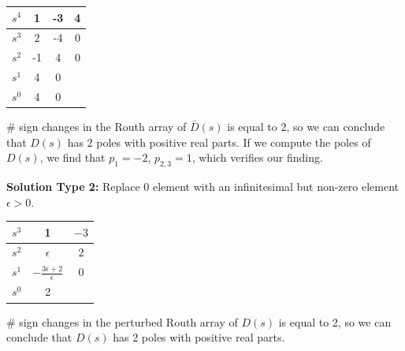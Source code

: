 \documentclass[twoside]{article}
\begin{document}
%
\begin{table}[h]
\begin{center}
\begin{tabular}{|c || c || c c |}
\hline
$s^4$ & 1 & -3 & 4 
\\ \hline
$s^3$ & 2 & -4 & 0
\\ \hline
$s^2$ & -1 & 4 & 0
\\ \hline
$s^1$ & 4 & 0 &
\\ \hline
$s^0$ & 4 & 0 & 
\\ \hline
\end{tabular}
\end{center}
\end{table}
%
$\#$ sign changes in the Routh array of $\bar{D}(s)$ is equal to 2, so
we can conclude that $D(s)$ has 2 poles with positive real parts. If
we compute the poles of $D(s)$, we find that $p_1 = -2$, $p_{2,3} = 1$,
which verifies our finding. 

\vspace{12pt}

\textbf{Solution Type 2:} Replace 0 element with an infinitesimal but
non-zero element $\epsilon >0$.
%
\begin{table}[h]
\begin{center}
\begin{tabular}{|c || c || c  |}
\hline
$s^3$ & 1 & $-3$ 
\\ \hline
$s^2$ & $\epsilon$ & 2
\\ \hline
$s^1$  & $- \frac{3 \epsilon + 2}{\epsilon}$ & 0 
\\ \hline
$s^0$  & 2 & 
\\ \hline
\end{tabular}
\end{center}
\end{table}

$\#$ sign changes in the perturbed Routh array of $D(s)$ is equal to 2, so
we can conclude that $D(s)$ has 2 poles with positive real parts.

\newpage
\end{document}
